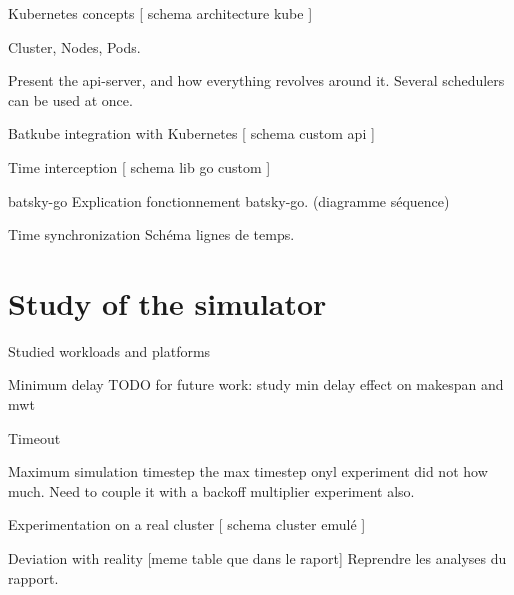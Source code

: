 \documentclass[12pt, aspectratio=43]{beamer}
\begin{document}
\begin{frame}{Kubernetes concepts}
	[ schema architecture kube ]

	Cluster, Nodes, Pods.

	Present the api-server, and how everything revolves around it. Several
	schedulers can be used at once.
\end{frame}

\begin{frame}{Batkube integration with Kubernetes}
	[ schema custom api ]
\end{frame}

\begin{frame}{Time interception}
	[ schema lib go custom ]
\end{frame}

\begin{frame}{batsky-go}
	Explication fonctionnement batsky-go. (diagramme séquence)
\end{frame}

\begin{frame}{Time synchronization}
	Schéma lignes de temps.
\end{frame}

\section{Study of the simulator}
\begin{frame}{Studied workloads and platforms}
\end{frame}

\begin{frame}{Minimum delay}
	TODO for future work: study min delay effect on makespan and mwt
\end{frame}

\begin{frame}{Timeout}
\end{frame}

\begin{frame}{Maximum simulation timestep}
	the max timestep onyl experiment did not how much. Need to couple it
	with a backoff multiplier experiment also.
\end{frame}

\begin{frame}{Experimentation on a real cluster}
	[ schema cluster emulé ]
\end{frame}

\begin{frame}{Deviation with reality}
	[meme table que dans le raport]
	Reprendre les analyses du rapport.
\end{frame}
\end{document}

